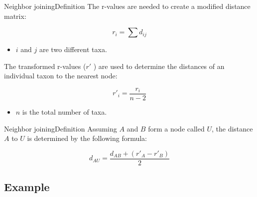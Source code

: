 \documentclass[10pt]{beamer}
\newcommand{\1}{
	\setbeamertemplate{background}{
		\texttt{[image: img/1]}
		\tikz[overlay] \fill[fill opacity=0.75,fill=white] (0,0) rectangle (-\paperwidth,\paperheight);
	}
}
\begin{document}
\begin{frame}{Neighbor joining}{Definition}
	The r-values are needed to create a modified
	distance matrix:
		
	\begin{equation}\label{eq:nj_2}
		r_i = \sum d_{ij}
	\end{equation} 
	
	\begin{itemize}
		\item $i$ and $j$ are two different taxa.
	\end{itemize}	

	\vspace{0.5cm}
	
	The transformed r-values ($r'$ ) are used to determine the distances of
	an individual taxon to the nearest node:
	
	\begin{equation}\label{eq:nj_3}
	r'_i =  \frac{r_i}{n-2}
	\end{equation} 
	\begin{itemize}
		\item $n$ is the total number of taxa.
	\end{itemize}
\end{frame}

\begin{frame}{Neighbor joining}{Definition}
	Assuming $A$ and $B$ form a node called
	$U$, the distance $A$ to $U$ is determined by the following formula:
	
	\begin{equation}\label{eq:nj_4}
		d_{AU} = \frac{ d_{AB} + ( r'_A - r'_B ) }{2}
	\end{equation} 
	
\end{frame}


\subsection{Example}
\end{document}
